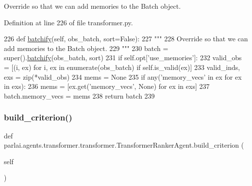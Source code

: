 \begin{DoxyVerb}Override so that we can add memories to the Batch object.
\end{DoxyVerb}
 

Definition at line 226 of file transformer.\+py.


\begin{DoxyCode}
226     \textcolor{keyword}{def }\hyperlink{namespaceparlai_1_1agents_1_1drqa_1_1utils_aca22dd97c5b6dcda2a7479c1cb22ef1e}{batchify}(self, obs\_batch, sort=False):
227         \textcolor{stringliteral}{"""}
228 \textcolor{stringliteral}{        Override so that we can add memories to the Batch object.}
229 \textcolor{stringliteral}{        """}
230         batch = super().\hyperlink{namespaceparlai_1_1agents_1_1drqa_1_1utils_aca22dd97c5b6dcda2a7479c1cb22ef1e}{batchify}(obs\_batch, sort)
231         \textcolor{keywordflow}{if} self.opt[\textcolor{stringliteral}{'use\_memories'}]:
232             valid\_obs = [(i, ex) \textcolor{keywordflow}{for} i, ex \textcolor{keywordflow}{in} enumerate(obs\_batch) \textcolor{keywordflow}{if} self.is\_valid(ex)]
233             valid\_inds, exs = zip(*valid\_obs)
234             mems = \textcolor{keywordtype}{None}
235             \textcolor{keywordflow}{if} any(\textcolor{stringliteral}{'memory\_vecs'} \textcolor{keywordflow}{in} ex \textcolor{keywordflow}{for} ex \textcolor{keywordflow}{in} exs):
236                 mems = [ex.get(\textcolor{stringliteral}{'memory\_vecs'}, \textcolor{keywordtype}{None}) \textcolor{keywordflow}{for} ex \textcolor{keywordflow}{in} exs]
237             batch.memory\_vecs = mems
238         \textcolor{keywordflow}{return} batch
239 
\end{DoxyCode}
\mbox{\label{classparlai_1_1agents_1_1transformer_1_1transformer_1_1TransformerRankerAgent_af91ef63ee5c7f7588a75e32587364c80}} 
\subsubsection{\texorpdfstring{build\+\_\+criterion()}{build\_criterion()}}
{\footnotesize\ttfamily def parlai.\+agents.\+transformer.\+transformer.\+Transformer\+Ranker\+Agent.\+build\+\_\+criterion (\begin{DoxyParamCaption}\item[{}]{self }\end{DoxyParamCaption})}

